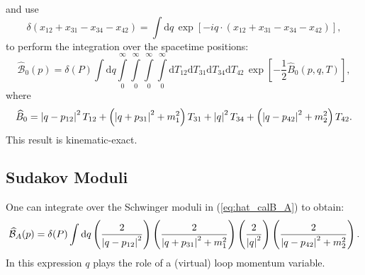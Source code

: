 and use
\begin{equation}
	\delta(x_{12} + x_{31} - x_{34} - x_{42}) = \int \mathrm{d}q \, \exp{\left[-i q \cdot (x_{12} + x_{31} - x_{34} - x_{42}) \right]},
\end{equation}
to perform the integration over the spacetime positions:
\begin{equation}
	\widehat{\mathcal{B}}_{0}(p) = \delta(P) \int \mathrm{d}q \int\limits_{0}^{\infty} \int\limits_{0}^{\infty} \int\limits_{0}^{\infty} \int\limits_{0}^{\infty} \mathrm{d}T_{12} \mathrm{d}T_{31} \mathrm{d}T_{34} \mathrm{d}T_{42} \, \exp{\left[- \frac{1}{2} \widehat{B}_{0}(p, q, T) \right]},
	\label{eq:hat_calB_A}
\end{equation}
where
\begin{equation}
	\widehat{B}_{0} = \left\lvert q - p_{12} \right\rvert^{2} T_{12} + \left(\left\lvert q + p_{31} \right\rvert^{2} + m_{1}^{2} \right) T_{31} + \left\lvert q \right\rvert^{2} T_{34} + \left(\left\lvert q - p_{42} \right\rvert^{2} + m_{2}^{2} \right) T_{42}.
\end{equation}
This result is kinematic-exact.
\subsection{Sudakov Moduli}
One can integrate over the Schwinger moduli in (\ref{eq:hat_calB_A}) to obtain:
\begin{equation}
	\widehat{\mathcal{B}}_{A}(p) = \delta(P) \int \mathrm{d}q \left( \frac{2}{\left\lvert q - p_{12} \right\rvert^{2}} \right) \left( \frac{2}{\left\lvert q + p_{31} \right\rvert^{2} + m_{1}^{2}} \right) \left( \frac{2}{\left\lvert q \right\rvert^{2}} \right) \left( \frac{2}{\left\lvert q - p_{42} \right\rvert^{2} + m_{2}^{2}} \right).
	\label{eq:sudakov_B_A}
\end{equation}
In this expression $q$ plays the role of a (virtual) loop momentum variable.

